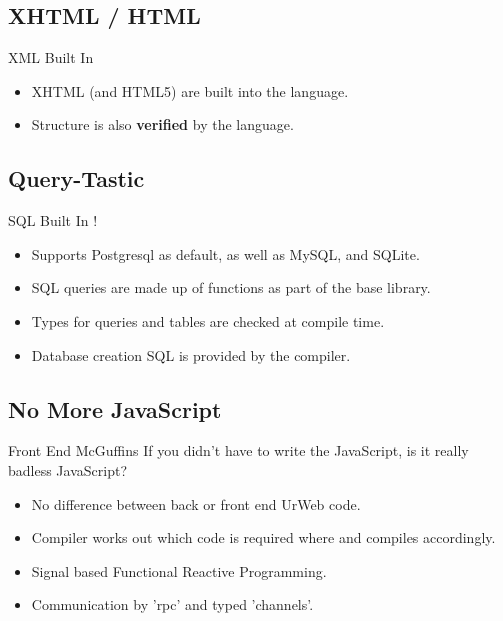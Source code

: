 \documentclass{beamer}
\begin{document}
\subsection{XHTML / HTML}
\begin{frame}{XML Built In}

\begin{itemize}
\item XHTML (and HTML5) are built into the language.\\
\item Structure is also \textbf{verified} by the language.
\end{itemize}

\end{frame}

\subsection{Query-Tastic}
\begin{frame}{SQL Built In !}

\begin{itemize}
\item Supports Postgresql as default, as well as MySQL, and SQLite.
\item SQL queries are made up of functions as part of the base library.
\item Types for queries and tables are checked at compile time.
\item Database creation SQL is provided by the compiler.
\end{itemize}

\end{frame}

\subsection{No More JavaScript}
\begin{frame}{Front End McGuffins}
If you didn't have to write the JavaScript, is it really badless JavaScript?\\

\begin{itemize}
\item No difference between back or front end UrWeb code.
\item Compiler works out which code is required where and compiles accordingly.
\item Signal based Functional Reactive Programming.
\item Communication by 'rpc' and typed 'channels'.
\end{itemize}
\end{frame}
\end{document}

